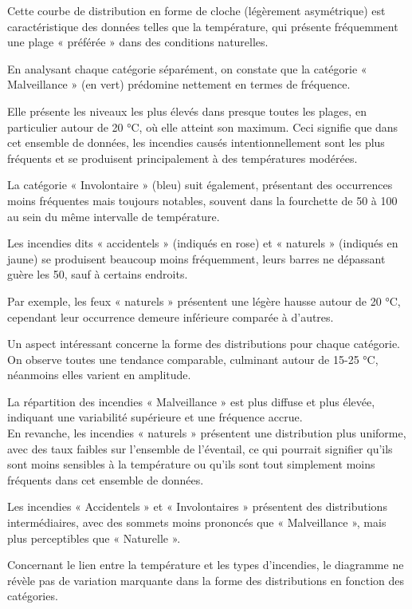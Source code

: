 \documentclass[
]{article}
\begin{document}
Cette courbe de distribution en forme de cloche (légèrement asymétrique)
est caractéristique des données telles que la température, qui présente
fréquemment une plage « préférée » dans des conditions naturelles.

En analysant chaque catégorie séparément, on constate que la catégorie «
Malveillance » (en vert) prédomine nettement en termes de fréquence.

Elle présente les niveaux les plus élevés dans presque toutes les
plages, en particulier autour de 20 °C, où elle atteint son maximum.
Ceci signifie que dans cet ensemble de données, les incendies causés
intentionnellement sont les plus fréquents et se produisent
principalement à des températures modérées.

La catégorie « Involontaire » (bleu) suit également, présentant des
occurrences moins fréquentes mais toujours notables, souvent dans la
fourchette de 50 à 100 au sein du même intervalle de température.

Les incendies dits « accidentels » (indiqués en rose) et « naturels »
(indiqués en jaune) se produisent beaucoup moins fréquemment, leurs
barres ne dépassant guère les 50, sauf à certains endroits.

Par exemple, les feux « naturels » présentent une légère hausse autour
de 20 °C, cependant leur occurrence demeure inférieure comparée à
d'autres.

Un aspect intéressant concerne la forme des distributions pour chaque
catégorie. On observe toutes une tendance comparable, culminant autour
de 15-25 °C, néanmoins elles varient en amplitude.

La répartition des incendies « Malveillance » est plus diffuse et plus
élevée, indiquant une variabilité supérieure et une fréquence accrue.\\
En revanche, les incendies « naturels » présentent une distribution plus
uniforme, avec des taux faibles sur l'ensemble de l'éventail, ce qui
pourrait signifier qu'ils sont moins sensibles à la température ou
qu'ils sont tout simplement moins fréquents dans cet ensemble de
données.

Les incendies « Accidentels » et « Involontaires » présentent des
distributions intermédiaires, avec des sommets moins prononcés que «
Malveillance », mais plus perceptibles que « Naturelle ».

Concernant le lien entre la température et les types d'incendies, le
diagramme ne révèle pas de variation marquante dans la forme des
distributions en fonction des catégories.
\end{document}
